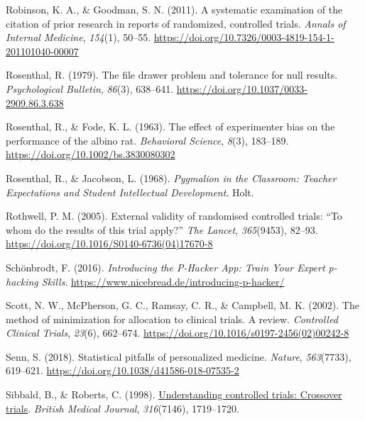\documentclass{krantz}
\newlength{\cslhangindent}
\newlength{\cslentryspacingunit} %
\newenvironment{CSLReferences}[2] %
{%
\setlength{\parindent}{0pt}
\ifodd #1
\let\oldpar\par
\def\par{\hangindent=\cslhangindent\oldpar}
\fi
\setlength{\parskip}{#2\cslentryspacingunit}
}%
{}
\begin{document}
\begin{CSLReferences}{1}{0}
\leavevmode{}%
Robinson, K. A., \& Goodman, S. N. (2011). A systematic examination of the citation of prior research in reports of randomized, controlled trials. \emph{Annals of Internal Medicine}, \emph{154}(1), 50--55. \url{https://doi.org/10.7326/0003-4819-154-1-201101040-00007}

\leavevmode{}%
Rosenthal, R. (1979). The file drawer problem and tolerance for null results. \emph{Psychological Bulletin}, \emph{86}(3), 638--641. \url{https://doi.org/10.1037/0033-2909.86.3.638}

\leavevmode{}%
Rosenthal, R., \& Fode, K. L. (1963). The effect of experimenter bias on the performance of the albino rat. \emph{Behavioral Science}, \emph{8}(3), 183--189. \url{https://doi.org/10.1002/bs.3830080302}

\leavevmode{}%
Rosenthal, R., \& Jacobson, L. (1968). \emph{Pygmalion in the {Classroom}: {Teacher} {Expectations} and {Student} {Intellectual} {Development}}. {Holt}.

\leavevmode{}%
Rothwell, P. M. (2005). External validity of randomised controlled trials: {``{To} whom do the results of this trial apply?''} \emph{The Lancet}, \emph{365}(9453), 82--93. \url{https://doi.org/10.1016/S0140-6736(04)17670-8}

\leavevmode{}%
Schönbrodt, F. (2016). \emph{Introducing the {P-Hacker} {App}: {Train} {Your} {Expert} p-hacking {Skills}}. \url{https://www.nicebread.de/introducing-p-hacker/}

\leavevmode{}%
Scott, N. W., McPherson, G. C., Ramsay, C. R., \& Campbell, M. K. (2002). The method of minimization for allocation to clinical trials. A review. \emph{Controlled Clinical Trials}, \emph{23}(6), 662--674. \url{https://doi.org/10.1016/s0197-2456(02)00242-8}

\leavevmode{}%
Senn, S. (2018). Statistical pitfalls of personalized medicine. \emph{Nature}, \emph{563}(7733), 619--621. \url{https://doi.org/10.1038/d41586-018-07535-2}

\leavevmode{}%
Sibbald, B., \& Roberts, C. (1998). \href{https://www.ncbi.nlm.nih.gov/pmc/articles/PMC1113275}{Understanding controlled trials: {Crossover} trials}. \emph{British Medical Journal}, \emph{316}(7146), 1719--1720.


\end{CSLReferences}
\end{document}
